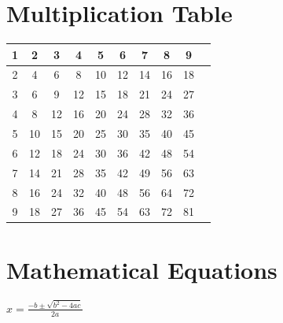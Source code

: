 \documentclass[a4paper,12pt]{article}
\begin{document}
\section{Multiplication Table}
\begin{center}
\begin{tabular}{ c| c | c | c | c | c | c | c | c | c | }
1& 2 & 3 & 4 & 5 & 6 & 7 & 8 & 9\\
\hline
2& 4 & 6 & 8 & 10 & 12 & 14 & 16 & 18 \\ 
\hline
3& 6 & 9 & 12 & 15 & 18 & 21 & 24 & 27\\ 
\hline
4& 8 & 12 & 16 & 20 & 24 & 28 & 32 & 36\\ 
\hline
5& 10 & 15 & 20 & 25 & 30 & 35 & 40 & 45 \\ 
\hline
6& 12 & 18 & 24 & 30 & 36 & 42 & 48 & 54\\

\hline
7& 14 & 21 & 28 & 35 & 42 & 49 & 56 & 63 \\ 
\hline
8& 16 & 24 & 32 & 40 & 48 & 56 & 64 & 72\\ 
\hline
9& 18 &  27 & 36 & 45 & 54 & 63 & 72 & 81 \\ 
\hline
\end{tabular}
\end{center}

\section {Mathematical Equations}
\begin{center}
\huge$x=\frac{-b\pm\sqrt{b^2-4ac}}{2a}$
\end{center}
\end{document}
